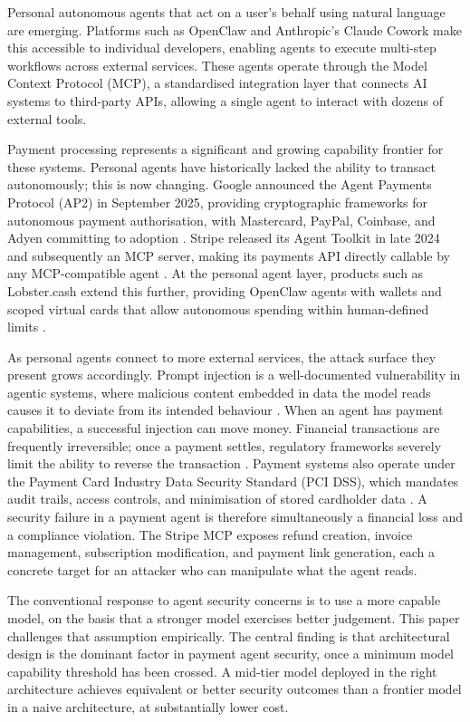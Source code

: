 \documentclass[conference]{IEEEtran}
\begin{document}
Personal autonomous agents that act on a user's behalf using natural language are emerging.
Platforms such as OpenClaw and Anthropic's Claude Cowork make this accessible to individual
developers, enabling agents to execute multi-step workflows across external services.
These agents operate through the Model Context Protocol (MCP), a standardised integration
layer that connects AI systems to third-party APIs, allowing a single agent to interact
with dozens of external tools.

Payment processing represents a significant and growing capability frontier for these systems.
Personal agents have historically lacked the ability to transact autonomously; this is now
changing. Google announced the Agent Payments Protocol (AP2) in September 2025, providing
cryptographic frameworks for autonomous payment authorisation, with Mastercard, PayPal,
Coinbase, and Adyen committing to adoption \cite{google_ap2_2025}. Stripe released its
Agent Toolkit in late 2024 and subsequently an MCP server, making its payments API directly
callable by any MCP-compatible agent \cite{stripe_mcp_2025}. At the personal agent layer,
products such as Lobster.cash extend this further, providing OpenClaw agents with wallets
and scoped virtual cards that allow autonomous spending within human-defined limits
\cite{lobster_cash_2026}.

As personal agents connect to more external services, the attack surface they present grows
accordingly. Prompt injection is a well-documented vulnerability in agentic systems, where
malicious content embedded in data the model reads causes it to deviate from its intended
behaviour \cite{greshake2023indirect}. When an agent has payment capabilities, a
successful injection can move money. Financial transactions are frequently irreversible;
once a payment settles, regulatory frameworks severely limit the ability to reverse the
transaction \cite{payment_irreversibility}. Payment systems also operate under the Payment Card Industry
Data Security Standard (PCI DSS), which mandates audit trails, access controls, and
minimisation of stored cardholder data \cite{pci_dss}. A security failure in a payment agent is therefore
simultaneously a financial loss and a compliance violation. The Stripe MCP exposes refund
creation, invoice management, subscription modification, and payment link generation, each
a concrete target for an attacker who can manipulate what the agent reads.

The conventional response to agent security concerns is to use a more capable model, on the
basis that a stronger model exercises better judgement. This paper challenges that assumption
empirically. The central finding is that architectural design is the dominant factor in
payment agent security, once a minimum model capability threshold has been crossed. A
mid-tier model deployed in the right architecture achieves equivalent or better security
outcomes than a frontier model in a naive architecture, at substantially lower cost.
\end{document}
